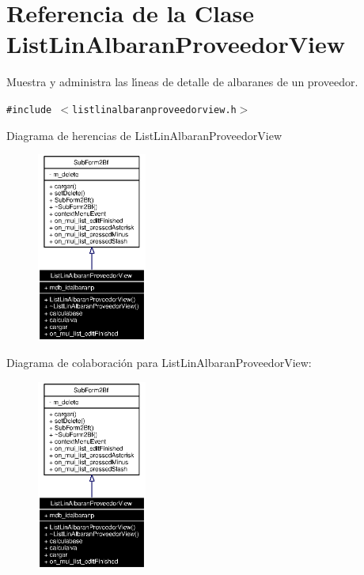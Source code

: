 \section{Referencia de la Clase List\-Lin\-Albaran\-Proveedor\-View}
\label{classListLinAlbaranProveedorView}
Muestra y administra las l\'{\i}neas de detalle de albaranes de un proveedor.  


{\tt \#include $<$listlinalbaranproveedorview.h$>$}

Diagrama de herencias de List\-Lin\-Albaran\-Proveedor\-View\begin{figure}[H]
\begin{center}
\leavevmode
\includegraphics[width=102pt]{classListLinAlbaranProveedorView__inherit__graph}
\end{center}
\end{figure}
Diagrama de colaboraci\'{o}n para List\-Lin\-Albaran\-Proveedor\-View:\begin{figure}[H]
\begin{center}
\leavevmode
\includegraphics[width=102pt]{classListLinAlbaranProveedorView__coll__graph}
\end{center}
\end{figure}
